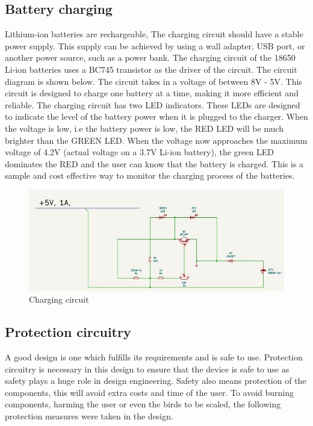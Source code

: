 \documentclass[class=report,11pt,crop=false]{standalone}
\begin{document}
	\subsection{Battery charging}
	\vspace{0.5cm}
	Lithium-ion batteries are rechargeable,  The charging circuit should have a stable power supply. This supply can be achieved  by using a wall adapter, USB port, or another power source, such as a power bank. The charging circuit of the 18650 Li-ion batteries uses a BC745 transistor as the driver of the circuit. The circuit diagram is shown below. The circuit takes in a voltage of between 8V - 5V. This circuit is designed to charge one battery at a time, making it more efficient and reliable. The charging circuit has two LED indicators. These LEDs are designed to indicate the level of the battery power when it is plugged to the charger. When the voltage is low, i.e the battery power is low, the RED LED will be much brighter than the GREEN LED. When the voltage now approaches the maximum voltage of 4.2V (actual voltage on a 3.7V Li-ion battery), the green LED dominates the RED and the user can know that the battery is charged. This is a sample and cost effective way to monitor the charging process of the batteries.
	
	
	\begin{figure}[h!]
		\centering
		\includegraphics[width=0.9\linewidth]{Figures/Charging.jpg}
		\caption{Charging circuit}
		\label{fig:P2}
	\end{figure}
	\vspace{0.5cm}
	
	
	\subsection{Protection circuitry}
	
	A good design is one which fulfills its requirements and is safe to use. Protection circuitry is necessary in this design to ensure that the device is safe to use as safety plays a huge role in design engineering. Safety also means protection of the components, this will avoid extra costs and time of the user. To avoid burning components, harming the user or even the birds to be scaled, the following protection measures were taken in the design.
	\vspace{0.5cm}
	
\end{document}
